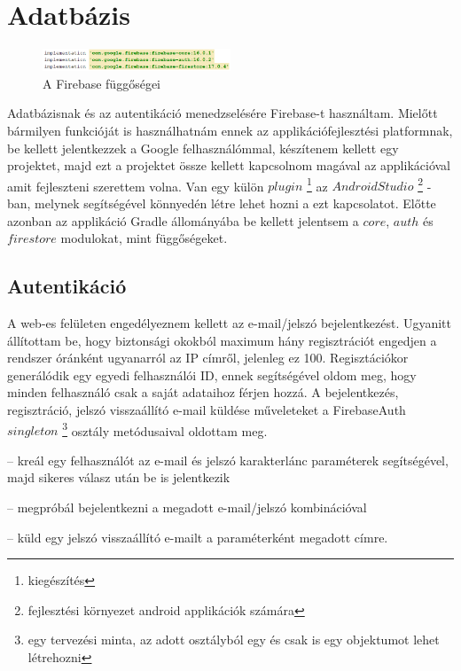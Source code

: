 \section{Adatbázis}\label{sec:ALAP:adatelem}

 \begin{figure}
	\centering
	\setlength{\abovecaptionskip}{0pt}
	\setlength{\belowcaptionskip}{0pt}
	\includegraphics[width=0.5\textwidth]{images/firebase_gradle}
	\caption{A Firebase függőségei\label{fig:ALAP:sm2}}
\end{figure}

Adatbázisnak és az autentikáció menedzselésére Firebase-t használtam. Mielőtt bármilyen funkcióját is használhatnám ennek az applikációfejlesztési platformnak, be kellett jelentkezzek a Google felhasználómmal, készítenem kellett egy projektet, majd ezt a projektet össze kellett kapcsolnom magával az applikációval amit fejleszteni szerettem volna. Van egy külön \(plugin\)%
\footnote{ %
	kiegészítés
}  %
 az \(Android Studio\)%
 \footnote{ %
 	fejlesztési környezet android applikációk számára
 }  %
-ban, melynek segítségével könnyedén létre lehet hozni a ezt kapcsolatot. Előtte azonban az applikáció Gradle állományába be kellett jelentsem a \(core\), \(auth\) és \(firestore\) modulokat, mint függőségeket.
 

 

\subsection{Autentikáció}

A web-es felületen engedélyeznem kellett az e-mail/jelszó bejelentkezést. Ugyanitt állítottam be, hogy biztonsági okokból maximum hány regisztrációt engedjen a rendszer óránként ugyanarról az IP címről, jelenleg ez 100. Regisztációkor generálódik egy egyedi felhasználói ID, ennek segítségével oldom meg, hogy minden felhasználó csak a saját adataihoz férjen hozzá. A bejelentkezés, regisztráció, jelszó visszaállító e-mail küldése műveleteket a FirebaseAuth \(singleton\)%
\footnote{ %
	egy tervezési minta, az adott osztályból egy és csak is egy objektumot lehet létrehozni
}  %
 osztály metódusaival oldottam meg.
 
 \begin{description}
 	\setlength{\itemsep}{0.04mm}
 	\item[createUserWithEmailAndPassword(email, jelszó)] -- kreál egy felhasználót az e-mail és jelszó karakterlánc paraméterek segítségével, majd sikeres válasz után be is jelentkezik
 	\item[signInWithEmailAndPassword(email, jelszó)] -- megpróbál bejelentkezni a megadott e-mail/jelszó kombinációval
 	\item[sendPasswordResetEmail(email)] -- küld egy jelszó visszaállító e-mailt a paraméterként megadott címre.
 \end{description}

